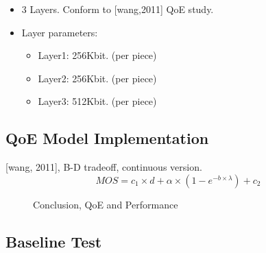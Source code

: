 \documentclass[11pt,a4paper]{article}
\begin{document}
\begin{itemize}
	\item 3 Layers. Conform to [wang,2011] QoE study.  
	\item Layer parameters:
		\begin{itemize}
			\item Layer1: 256Kbit. (per piece) 
			\item Layer2: 256Kbit. (per piece) 
			\item Layer3: 512Kbit. (per piece) 
		\end{itemize}
\end{itemize}

\subsection{QoE Model Implementation}

[wang, 2011], B-D tradeoff, continuous version. 
\begin{equation}
	MOS = c_1 \times d + \alpha \times (1 - e^{-b \times \lambda}) + c_2
\end{equation}
\begin{figure}
	\caption{Conclusion, QoE and Performance}
\end{figure}


\subsection{Baseline Test}
\end{document}
